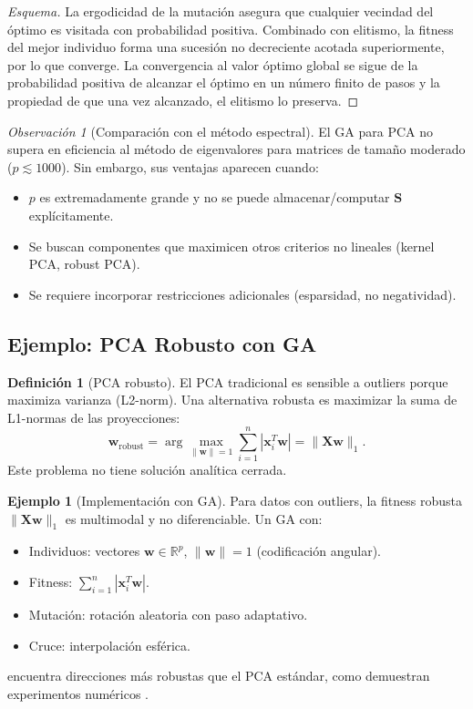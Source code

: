 \documentclass[11pt,a4paper]{article}
\theoremstyle{plain}
\theoremstyle{definition}
\newtheorem{definition}[theorem]{Definición}
\newtheorem{example}[theorem]{Ejemplo}
\theoremstyle{remark}
\newtheorem{remark}[theorem]{Observación}
\newcommand{\1}{\mathbf{1}}
\begin{document}
\begin{proof}[Esquema]
La ergodicidad de la mutación asegura que cualquier vecindad del óptimo es visitada con probabilidad positiva. Combinado con elitismo, la fitness del mejor individuo forma una sucesión no decreciente acotada superiormente, por lo que converge. La convergencia al valor óptimo global se sigue de la probabilidad positiva de alcanzar el óptimo en un número finito de pasos y la propiedad de que una vez alcanzado, el elitismo lo preserva.
\end{proof}

\begin{remark}[Comparación con el método espectral]
El GA para PCA no supera en eficiencia al método de eigenvalores para matrices de tamaño moderado ($p \lesssim 1000$). Sin embargo, sus ventajas aparecen cuando:
\begin{itemize}
\item $p$ es extremadamente grande y no se puede almacenar/computar $\mathbf{S}$ explícitamente.
\item Se buscan componentes que maximicen otros criterios no lineales (kernel PCA, robust PCA).
\item Se requiere incorporar restricciones adicionales (esparsidad, no negatividad).
\end{itemize}
\end{remark}

\subsection{Ejemplo: PCA Robusto con GA}

\begin{definition}[PCA robusto]
El PCA tradicional es sensible a outliers porque maximiza varianza (L2-norm). Una alternativa robusta es maximizar la suma de L1-normas de las proyecciones:
\[
\mathbf{w}_{\text{robust}} = \arg\max_{\|\mathbf{w}\|=1} \sum_{i=1}^n |\mathbf{x}_i^T \mathbf{w}| = \|\mathbf{X} \mathbf{w}\|_1.
\]
Este problema no tiene solución analítica cerrada.
\end{definition}

\begin{example}[Implementación con GA]
Para datos con outliers, la fitness robusta $\|\mathbf{X} \mathbf{w}\|_1$ es multimodal y no diferenciable. Un GA con:
\begin{itemize}
\item Individuos: vectores $\mathbf{w} \in \mathbb{R}^p$, $\|\mathbf{w}\|=1$ (codificación angular).
\item Fitness: $\sum_{i=1}^n |\mathbf{x}_i^T \mathbf{w}|$.
\item Mutación: rotación aleatoria con paso adaptativo.
\item Cruce: interpolación esférica.
\end{itemize}
encuentra direcciones más robustas que el PCA estándar, como demuestran experimentos numéricos \cite{back1996evolutionary}.
\end{example}
\end{document}
